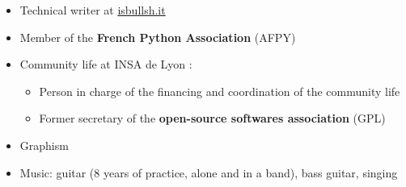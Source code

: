 \begin{itemize}
\renewcommand{\labelitemi}{$\circ$}
	\item Technical writer at \href{http://isbullsh.it}{isbullsh.it}
	\item Member of the \textbf{French Python Association} (AFPY) 
	\item Community life at INSA de Lyon :
	\begin{itemize}
		\item Person in charge of the financing and coordination of the community life
		\item Former secretary of the \textbf{open-source softwares association} (GPL) 
	\end{itemize}
    \item Graphism
    \item Music: guitar (8 years of practice, alone and in a band), bass guitar, singing    
\end{itemize}



